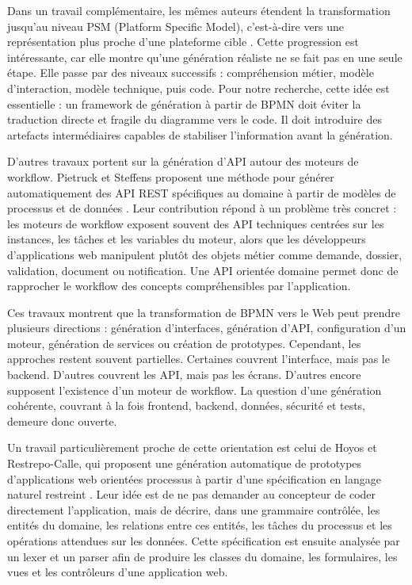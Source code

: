 Dans un travail complémentaire, les mêmes auteurs étendent la
transformation jusqu'au niveau PSM (Platform Specific Model),
c'est-à-dire vers une représentation plus proche d'une plateforme cible
\cite{sajji2023}. Cette progression est intéressante, car elle montre qu'une
génération réaliste ne se fait pas en une seule étape. Elle passe par
des niveaux successifs : compréhension métier, modèle d'interaction,
modèle technique, puis code. Pour notre recherche, cette idée est
essentielle : un framework de génération à partir de BPMN doit éviter la
traduction directe et fragile du diagramme vers le code. Il doit
introduire des artefacts intermédiaires capables de stabiliser
l'information avant la génération.

D'autres travaux portent sur la génération d'API autour des moteurs de
workflow. Pietruck et Steffens proposent une méthode pour générer
automatiquement des API REST spécifiques au domaine à partir de modèles
de processus et de données \cite{pietruck2020}. Leur contribution répond à un
problème très concret : les moteurs de workflow exposent souvent des API
techniques centrées sur les instances, les tâches et les variables du
moteur, alors que les développeurs d'applications web manipulent plutôt
des objets métier comme demande, dossier, validation, document ou
notification. Une API orientée domaine permet donc de rapprocher le
workflow des concepts compréhensibles par l'application.

Ces travaux montrent que la transformation de BPMN vers le Web peut
prendre plusieurs directions : génération d'interfaces, génération
d'API, configuration d'un moteur, génération de services ou création de
prototypes. Cependant, les approches restent souvent partielles.
Certaines couvrent l'interface, mais pas le backend. D'autres couvrent
les API, mais pas les écrans. D'autres encore supposent l'existence d'un
moteur de workflow. La question d'une génération cohérente, couvrant à
la fois frontend, backend, données, sécurité et tests, demeure donc
ouverte.

Un travail particulièrement proche de cette orientation est celui de
Hoyos et Restrepo-Calle, qui proposent une génération automatique de
prototypes d'applications web orientées processus à partir d'une
spécification en langage naturel restreint \cite{hoyos2017}. Leur idée est de ne
pas demander au concepteur de coder directement l'application, mais de
décrire, dans une grammaire contrôlée, les entités du domaine, les
relations entre ces entités, les tâches du processus et les opérations
attendues sur les données. Cette spécification est ensuite analysée par
un lexer et un parser afin de produire les classes du domaine, les
formulaires, les vues et les contrôleurs d'une application web.

